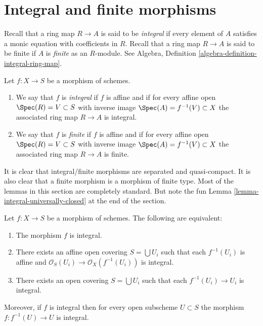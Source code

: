 \section{Integral and finite morphisms}
\label{section-integral}

\noindent
Recall that a ring map $R \to A$ is said to be {\it integral}
if every element of $A$ satisfies a monic equation with
coefficients in $R$. Recall that a ring map $R \to A$ is
said to be finite if $A$ is {\it finite} as an $R$-module.
See Algebra, Definition \ref{algebra-definition-integral-ring-map}.

\begin{definition}
\label{definition-integral}
Let $f : X \to S$ be a morphism of schemes.
\begin{enumerate}
\item We say that $f$ is {\it integral} if $f$ is affine
and if for every affine open $\Spec(R) = V \subset S$
with inverse image $\Spec(A) = f^{-1}(V) \subset X$
the associated ring map $R \to A$ is integral.
\item We say that $f$ is {\it finite} if $f$ is affine
and if for every affine open $\Spec(R) = V \subset S$
with inverse image $\Spec(A) = f^{-1}(V) \subset X$
the associated ring map $R \to A$ is finite.
\end{enumerate}
\end{definition}

\noindent
It is clear that integral/finite morphisms are separated and
quasi-compact. It is also clear that a finite morphism is a
morphism of finite type. Most of the lemmas in this section are
completely standard.
But note the fun Lemma \ref{lemma-integral-universally-closed}
at the end of the section.

\begin{lemma}
\label{lemma-integral-local}
Let $f : X \to S$ be a morphism of schemes.
The following are equivalent:
\begin{enumerate}
\item The morphism $f$ is integral.
\item There exists an affine open covering $S = \bigcup U_i$ such that
each $f^{-1}(U_i)$ is affine and
$\mathcal{O}_S(U_i) \to \mathcal{O}_X(f^{-1}(U_i))$ is integral.
\item There exists an open covering $S = \bigcup U_i$
such that each $f^{-1}(U_i) \to U_i$ is integral.
\end{enumerate}
Moreover, if $f$ is integral then for every open subscheme
$U \subset S$ the morphism $f : f^{-1}(U) \to U$ is integral.
\end{lemma}

